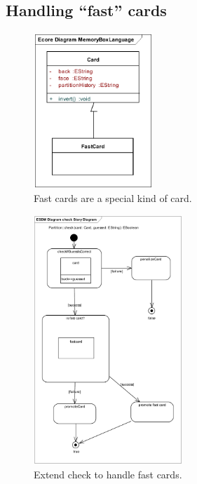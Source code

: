 \subsection{Handling ``fast'' cards}
	

\begin{figure}[htp]
\begin{center}
  \includegraphics[width=0.4\textwidth]{pics/sdmBilder/bindings/fastcard}
  \caption{Fast cards are a special kind of card.}  
  \label{fig:sdm_fastcard_1}
\end{center}
\end{figure}

\begin{figure}[htp]
\begin{center}
  \includegraphics[width=0.5\textwidth]{pics/sdmBilder/bindings/fastcard_controlflow}
  \caption{Extend check to handle fast cards.}  
  \label{fig:sdm_fastcard_2}
\end{center}
\end{figure}

